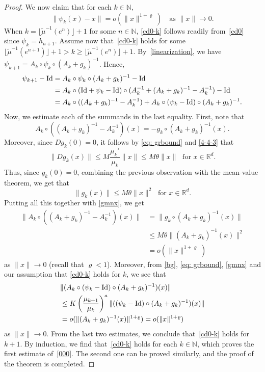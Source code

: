 \documentclass[reqno, a4paper, 10pt]{amsart}
\theoremstyle{plain}
\numberwithin{equation}{section}
\theoremstyle{remark}
\def\N{\mathbb{N}}
\def\R{\mathbb{R}}
\def\Id{\text{\rm Id}}
\begin{document}
\begin{proof}
We now claim that for each $k\in \N$,
\begin{equation}\label{cd0-k}
    \|\psi_k(x)-x\|=o(\|x\|^{1+\varrho})\quad \mbox{as $\|x\|\to 0$}.
\end{equation}
When $k=\lfloor\widetilde\mu^{-1}(e^n)\rfloor+1$ for some $n\in \N$, \eqref{cd0-k} follows readily from~\eqref{cd0} since $\psi_k=h_{n+1}$. Assume now that~\eqref{cd0-k} 
holds for some $\lfloor\widetilde\mu^{-1}(e^{n+1})\rfloor +1>  k
\ge \lfloor\widetilde\mu^{-1}(e^n)\rfloor+1
$. By~\eqref{linearization}, we have $\psi_{k+1}=A_k\circ \psi_k \circ (A_k+g_k)^{-1}$. Hence,  
\[
\begin{split}
\psi_{k+1}-\Id &=A_k\circ \psi_k \circ (A_k+g_k)^{-1}-\Id \\
&=A_k\circ (\Id+{\psi}_k-\Id)\circ (A_k^{-1}+(A_k+g_k)^{-1}-A_k^{-1})-\Id \\
&=A_k \circ ((A_k+g_k)^{-1}-A_k^{-1})+A_k\circ ({\psi}_k-\Id)\circ (A_k+g_k)^{-1}.
\end{split}
\]
Now, we estimate each of the summands in the last equality. First, note that 
\[A_k \circ ((A_k+g_k)^{-1}-A_k^{-1})(x)= -g_k\circ(A_k+g_k)^{-1}(x). \]
Moreover, since $Dg_k(0)=0$, it follows by \eqref{eq: grbound} and \eqref{4-4-3} that
\[\|Dg_k(x)\|\leq M \frac{\mu_k'}{\mu_k}\|x\|\leq M\theta\|x\| \; \text{ for } x\in \R^d. \]
Thus, since $g_k(0)=0$, combining the previous observation with the mean-value theorem, we get that
\[\|g_k(x)\|\leq M\theta \|x\|^2 \; \text{ for } x\in \R^d.\]
Putting all this together with \eqref{gmnx}, we get
\begin{align*}
\|A_k \circ ((A_k+g_k)^{-1}-A_k^{-1})(x)\|&= \|g_k\circ(A_k+g_k)^{-1}(x)\| \\
&\le M\theta \|(A_k+g_k)^{-1}(x)\|^2\\
&=o(\|x\|^{1+\varrho})
\end{align*}
as $\|x\|\to 0$ (recall that $\varrho <1$). Moreover, from \eqref{bg}, \eqref{eq: grbound}, \eqref{gmnx} and our assumption that \eqref{cd0-k} holds for $k$, we see that
\[
\begin{split}
&\|(A_k\circ ({\psi}_k-\Id)\circ (A_k+g_k)^{-1})(x)\|
\\
&\le  K\left(\frac{\mu_{k+1}}{\mu_k}\right) ^a\|(({\psi}_k-\Id)\circ (A_k+g_k)^{-1})(x)\|
\\
&= o(\|(A_k+g_k)^{-1}(x)\|^{1+\varrho})
=o(\|x\|^{1+\varrho})
\end{split}
\]
as $\|x\|\to 0$. From the last two estimates, we conclude that~\eqref{cd0-k} holds for $k+1$. By induction, we find that~\eqref{cd0-k} holds for each $k\in \N$, which proves the first estimate of~\eqref{000}. The second one can be proved similarly, and the proof of the theorem is completed. 
\end{proof} 
\end{document}
